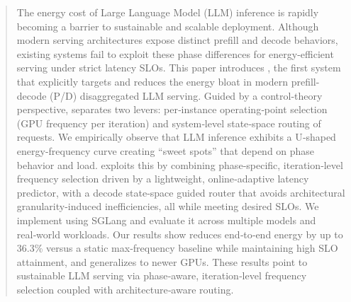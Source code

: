\begin{abstract}


The energy cost of Large Language Model (LLM) inference is rapidly becoming a barrier to sustainable and scalable deployment. Although modern serving architectures expose distinct prefill and decode behaviors, existing systems fail to exploit these phase differences for energy-efficient serving under strict latency SLOs. 
This paper introduces \name, the first system that explicitly targets and reduces the energy bloat in modern prefill-decode (P/D) disaggregated LLM serving. 
Guided by a control‑theory perspective, \name separates two levers: per‑instance operating‑point selection (GPU frequency per iteration) and system‑level state‑space routing of requests. We empirically observe that LLM inference exhibits a U‑shaped energy-frequency curve creating ``sweet spots'' that depend on phase behavior and load.
\name exploits this by combining phase‑specific, iteration‑level frequency selection driven by a lightweight, online‑adaptive latency predictor, with a decode state‑space guided router that avoids architectural granularity-induced inefficiencies, all while meeting desired SLOs.
We implement \name using SGLang and evaluate it across multiple models and real‑world workloads.
Our results show \name reduces end‑to‑end energy by up to 36.3\% versus a static max‑frequency baseline while maintaining high SLO attainment, and generalizes to newer GPUs.
These results point to sustainable LLM serving via phase‑aware, iteration‑level frequency selection coupled with architecture‑aware routing.




\end{abstract}
